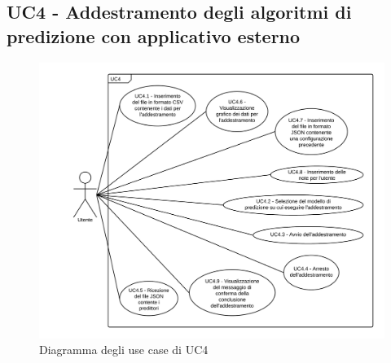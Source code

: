 \subsection{UC4 - Addestramento degli algoritmi di predizione con applicativo esterno}
\begin{figure}[H]
	\includegraphics[width=\textwidth,height=\textheight,keepaspectratio]{img/UC4_-_Addestramento_degli_algoritmi_di_predizione_con_applicativo_esterno.png}
	\caption{Diagramma degli use case di UC4}
\end{figure}
